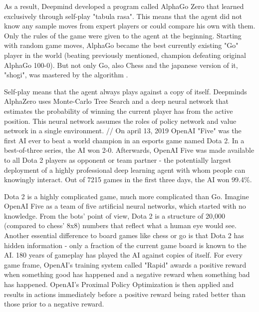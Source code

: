 As a result, Deepmind developed a program called AlphaGo Zero that learned exclusively through self-play "tabula rasa". This means that the agent did not know any sample moves from expert players or could compare his own with them. Only the rules of the game were given to the agent at the beginning. Starting with random game moves, AlphaGo became the best currently existing "Go" player in the world (beating previously mentioned, champion defeating original AlphaGo 100-0). But not only Go, also Chess and the japanese version of it, "shogi", was mastered by the algorithm \cite{chessSilver2017mastering,GoalphaGosilver2017mastering}. 

Self-play means that the agent always plays against a copy of itself.
Deepminds AlphaZero uses Monte-Carlo Tree Search \cite{montecarlobrowne2012survey} and a deep neural network that estimates the probability of winning the current player has from the active position. This neural network assumes the roles of policy network and value network in a single environment.
//
On april 13, 2019 OpenAI "Five" was the first AI ever to beat a world champion in an esports game named Dota 2. In a best-of-three series, the AI won 2-0. Afterwards, OpenAI Five was made available to all Dota 2 players as opponent or team partner - the potentially largest deployment of a highly professional deep learning agent with whom people can knowingly interact. Out of 7215 games in the first three days, the AI won 99.4\%\cite{dotaOpenAI2019Jun}.

Dota 2 is a highly complicated game, much more complicated than Go. Imagine OpenAI Five as a team of five artificial neural networks, which started with no knowledge. From the bots' point of view, Dota 2 is a structure of 20,000 (compared to chess' 8x8) numbers that reflect what a human eye would see. Another essential difference to board games like chess or go is that Dota 2 has hidden information - only a fraction of the current game board is known to the AI. 180 years of gameplay has played the AI against copies of itself. For every game frame, OpenAI's training system called "Rapid" awards a positive reward when something good has happened and a negative reward when something bad has happened. OpenAI's Proximal Policy Optimization \cite{ppoSchulman2019Mar} is then applied and results in actions immediately before a positive reward being rated better than those prior to a negative reward.





